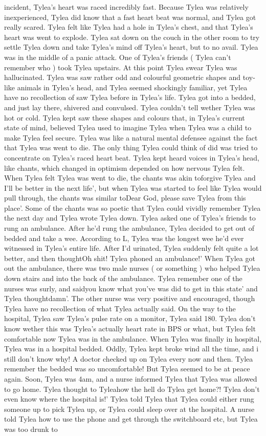 \documentclass[12pt]{book}
\begin{document}
incident, Tylea's heart was raced incredibly fast. Because Tylea was relatively inexperienced, Tylea did know that a fast heart beat was normal, and Tylea got really scared. Tylea felt like Tylea had a hole in Tylea's chest, and that Tylea's heart was went to explode. Tylea sat down on the couch in the other room to try settle Tylea down and take Tylea's mind off Tylea's heart, but to no avail. Tylea was in the middle of a panic attack. One of Tylea's friends ( Tylea can't remember who ) took Tylea upstairs. At this point Tylea swear Tylea was hallucinated. Tylea was saw rather odd and colourful geometric shapes and toy-like animals in Tylea's head, and Tylea seemed shockingly familiar, yet Tylea have no recollection of saw Tylea before in Tylea's life. Tylea got into a bedded, and just lay there, shivered and convulsed. Tylea couldn't tell wether Tylea was hot or cold. Tylea kept saw these shapes and colours that, in Tylea's current state of mind, believed Tylea used to imagine Tylea when Tylea was a child to make Tylea feel secure. Tylea was like a natural mental defensee against the fact that Tylea was went to die. The only thing Tylea could think of did was tried to concentrate on Tylea's raced heart beat. Tylea kept heard voices in Tylea's head, like chants, which changed in optimism depended on how nervous Tylea felt. When Tylea felt Tylea was went to die, the chants was akin toforgive Tylea and I'll be better in the next life', but when Tylea was started to feel like Tylea would pull through, the chants was similar toDear God, please save Tylea from this place'. Some of the chants was so poetic that Tylea could vividly remember Tylea the next day and Tylea wrote Tylea down. Tylea asked one of Tylea's friends to rung an ambulance. After he'd rung the ambulance, Tylea decided to get out of bedded and take a wee. According to L, Tylea was the longest wee he'd ever witnessed in Tylea's entire life. After I'd urinated, Tylea suddenly felt quite a lot better, and then thoughtOh shit! Tylea phoned an ambulance!' When Tylea got out the ambulance, there was two male nurses ( or something ) who helped Tylea down stairs and into the back of the ambulance. Tylea remember one of the nurses was surly, and saidyou know what you've was did to get in this state' and Tylea thoughtdamn'. The other nurse was very positive and encouraged, though Tylea have no recollection of what Tylea actually said. On the way to the hospital, Tylea saw Tylea's pulse rate on a monitor, Tylea said 180. Tylea don't know wether this was Tylea's actually heart rate in BPS or what, but Tylea felt comfortable now Tylea was in the ambulance. When Tylea was finally in hospital, Tylea was in a hospital bedded. Oddly, Tylea kept broke wind all the time, and i still don't know why! A doctor checked up on Tylea every now and then. Tylea remember the bedded was so uncomfortable! But Tylea seemed to be at peace again. Soon, Tylea was 4am, and a nurse informed Tylea that Tylea was allowed to go home. Tylea thought to Tyleahow the hell do Tylea get home?! Tylea don't even know where the hospital is!' Tylea told Tylea that Tylea could either rung someone up to pick Tylea up, or Tylea could sleep over at the hospital. A nurse told Tylea how to use the phone and get through the switchboard etc, but Tylea was too drunk to 
\end{document}
